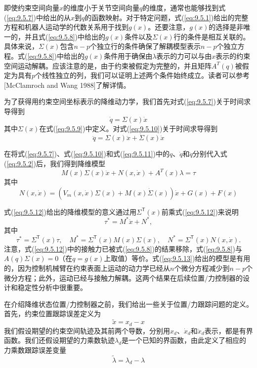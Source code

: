 \documentclass[12pt,a4paper]{ctexart}
\begin{document}
即使约束空间向量$x$的维度小于关节空间向量$q$的维度，通常也能够找到式(\ref{eq:9.5.7})中给出的从$x$到$q$的函数映射。对于特定问题，式(\ref{eq:9.5.1})给出的完整方程和机器人运动学的代数关系用于找到$g(x)$。还要注意，$g(x)$的选择是非唯一的，并且式(\ref{eq:9.5.8})中给出的$g(x)$条件以及$\Sigma(x)$行的条件是相互关联的。具体来说，$\Sigma(x)$包含$n - p$个独立行的条件确保了解耦模型表示$n - p$个独立方程。式(\ref{eq:9.5.8})中给出的$g(x)$条件用于确保由$\lambda$表示的力可以与由$x$表示的约束空间运动解耦。应该注意的是，由于约束被假定为完整的，并且矩阵$A^T(q)$被假定为具有$p$个线性独立的列，我们可以证明上述两个条件始终成立。读者可以参考[McClamroch and Wang 1988]了解详情。

为了获得用约束空间坐标表示的降维动力学，我们首先对式(\ref{eq:9.5.7})关于时间求导得到
\begin{equation}\label{eq:9.5.10}
\dot{q} = \Sigma(x)\dot{x}
\end{equation}
其中$\Sigma(x)$在式(\ref{eq:9.5.9})中定义。对式(\ref{eq:9.5.10})关于时间求导得到
\begin{equation}\label{eq:9.5.11}
\ddot{q} = \Sigma(x)\ddot{x} + \dot{\Sigma}(x)\dot{x}
\end{equation}

在将式(\ref{eq:9.5.7})、式(\ref{eq:9.5.10})和式(\ref{eq:9.5.11})中的$q$、$\dot{q}$和$\ddot{q}$分别代入式(\ref{eq:9.5.2})后，我们得到降维模型
\begin{equation}\label{eq:9.5.12}
M(x)\Sigma(x)\ddot{x} + N(x, \dot{x}) + A^T(x)\lambda = \tau
\end{equation}
其中
\[
N(x, \dot{x}) = (V_m(x, \dot{x})\Sigma(x) + M(x)\dot{\Sigma}(x))\dot{x} + G(x) + F(x)
\]

式(\ref{eq:9.5.12})给出的降维模型的意义通过用$\Sigma^{\mathsf T}(x)$前乘式(\ref{eq:9.5.12})来说明
\begin{equation}\label{eq:9.5.13}
\tau^* = M^*\ddot{x} + N^*,
\end{equation}
其中
\[
\tau^* = \Sigma^{\mathsf T}(x)\tau, \quad M^* = \Sigma^{\mathsf T}(x)M(x)\Sigma(x), \quad N^* = \Sigma^{\mathsf T}(x)N(x, \dot{x}).
\]
注意，式(\ref{eq:9.5.12})中的接触力已被式(\ref{eq:9.5.8})的结果移除，式(\ref{eq:9.5.8})与$A(q)\Sigma(x)=0$（在$q=g(x)$上取值）等价。式(\ref{eq:9.5.13})给出的模型是有用的，因为控制机械臂在约束表面上运动的动力学已经从$n$个微分方程减少到$n - p$个微分方程；此外，运动已经与接触力解耦。这两个结果在后续位置/力控制器的设计和稳定性分析中很重要。

在介绍降维状态位置/力控制器之前，我们给出一些关于位置/力跟踪问题的定义。首先，约束位置跟踪误差定义为
\begin{equation}\label{eq:9.5.14}
\tilde{x} = x_d - x
\end{equation}
我们假设期望的约束空间轨迹及其前两个导数，分别用$x_d$、$\dot{x}_d$和$\ddot{x}_d$表示，都是有界函数。我们还假设期望的力乘数轨迹$\lambda_d$是一个已知的界函数，由此定义了相应的力乘数跟踪误差变量
\begin{equation}\label{eq:9.5.15}
\tilde{\lambda} = \lambda_d - \lambda
\end{equation}
\end{document}
